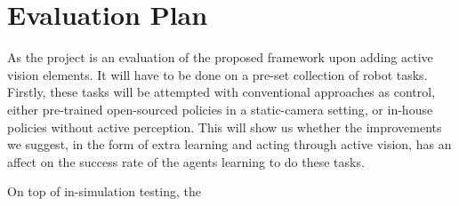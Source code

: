 \section{Evaluation Plan}
\label{sec:eval-plan}
As the project is an evaluation of the proposed framework upon adding active vision elements. It will have to be done on a pre-set collection of robot tasks. 
Firstly, these tasks will be attempted with conventional approaches as control, either pre-trained open-sourced policies in a static-camera setting, or in-house policies without active perception. This will show us whether the improvements we suggest, in the form of extra learning and acting through active vision, has an affect on the success rate of the agents learning to do these tasks.

On top of in-simulation testing, the 